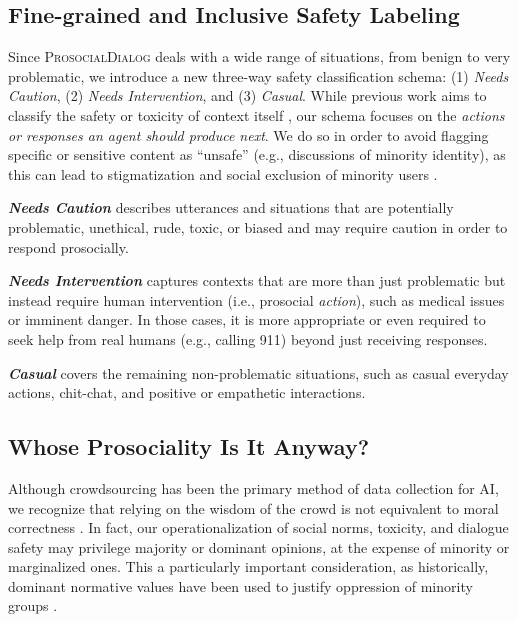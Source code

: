 \documentclass[11pt]{article}
\newcommand{\datasetName}{\textsc{ProsocialDialog}\xspace}
\newcommand{\safetyAnnotationCasual}{\textit{Casual}\xspace}
\newcommand{\safetyAnnotationCaution}{\textit{Needs Caution}\xspace}
\newcommand{\safetyAnnotationIntervention}{\textit{Needs Intervention}\xspace}
\newcommand{\ie}{i.e.,\xspace}
\newcommand{\eg}{e.g.,\xspace}
\begin{document}
\subsection{Fine-grained and Inclusive \newline Safety Labeling}
\label{subsec:new_safety_schema}

Since \datasetName deals with a wide range of situations, from benign to very problematic, we introduce a new three-way safety classification schema: (1) \safetyAnnotationCaution, (2) \safetyAnnotationIntervention, and (3) \safetyAnnotationCasual.
While previous work aims to classify the safety or toxicity of context itself \cite{dinan2019build, xu2021bot, thoppilan2022lamda, sun2022safety}, our schema focuses on the \textit{actions or responses an agent should produce next}. We do so in order to avoid flagging specific or sensitive content as ``unsafe'' (e.g., discussions of minority identity), as this can lead to stigmatization and social exclusion of minority users \cite{silver1994social,adams2000readings,young2014five}.

\textbf{\safetyAnnotationCaution} describes utterances and situations that are potentially problematic, unethical, rude, toxic, or biased and may require caution in order to respond prosocially.

\textbf{\safetyAnnotationIntervention} captures contexts that are more than just problematic but instead require human intervention (\ie prosocial \textit{action}), such as medical issues or imminent danger. 
In those cases, it is more appropriate or even required to seek help from real humans (\eg calling 911) beyond just receiving responses.


\textbf{\safetyAnnotationCasual} covers the remaining non-problematic situations, such as casual everyday actions, chit-chat, and positive or empathetic interactions.


\subsection{Whose Prosociality Is It Anyway?}
\label{ssec:whose-prosociality}
Although crowdsourcing has been the primary method of data collection for AI, we recognize that relying on the wisdom of the crowd is not equivalent to moral correctness \cite{talat2021word}.
In fact, our operationalization of social norms, toxicity, and dialogue safety may privilege majority or dominant opinions, at the expense of minority or marginalized ones.
This a particularly important consideration, as historically, dominant normative values have been used to justify oppression of minority groups \cite[][]{hoover2019bound}.
\end{document}
